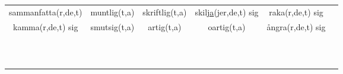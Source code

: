 \begin{center}
\begin{adjustwidth}{-2.5cm}{}
\begin{tabular}{|c c c c c c|}
            sammanfatta(r,de,t) & muntlig(t,a) & skriftlig(t,a) & skil\underline{ja}(jer,de,t) sig & raka(r,de,t) sig &  \\
            kamma(r,de,t) sig & smutsig(t,a) & artig(t,a) & oartig(t,a) & ångra(r,de,t) sig &  \\
             &  &  &  &  &  \\
             &  &  &  &  &  \\
             &  &  &  &  &  \\
             &  &  &  &  &  \\
             &  &  &  &  &  \\
             &  &  &  &  &  \\
             &  &  &  &  &  \\
             &  &  &  &  &  \\
             &  &  &  &  &  \\
             &  &  &  &  &  \\
             &  &  &  &  &  \\
            \hline
        \end{tabular}
    \end{adjustwidth}
\end{center}

